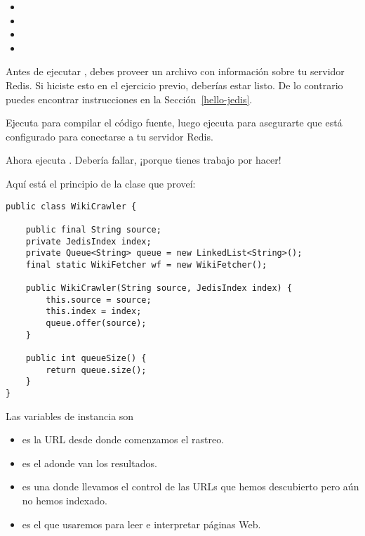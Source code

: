 \documentclass[12pt]{book}
\theoremstyle{exercise}
\begin{document}
\begin{itemize}
\item  {}
\item  {}
\item  {}
\item  {}
\end{itemize}

Antes de ejecutar , debes proveer un archivo con información
sobre tu servidor Redis. Si hiciste esto en el ejercicio previo, deberías
estar listo. De lo contrario puedes encontrar instrucciones en la
Sección~\ref{hello-jedis}.


Ejecuta  para compilar el código fuente, luego ejecuta
 para asegurarte que está configurado para conectarse
a tu servidor Redis.

Ahora ejecuta . Debería
fallar, ¡porque tienes trabajo por hacer!

Aquí está el principio de la clase  que proveí:

\begin{verbatim}
public class WikiCrawler {

    public final String source;
    private JedisIndex index;
    private Queue<String> queue = new LinkedList<String>();
    final static WikiFetcher wf = new WikiFetcher();

    public WikiCrawler(String source, JedisIndex index) {
        this.source = source;
        this.index = index;
        queue.offer(source);
    }

    public int queueSize() {
        return queue.size();
    }
}
\end{verbatim}

Las variables de instancia son

\begin{itemize}

\item
   es la URL desde donde comenzamos el rastreo.

\item
   es el  adonde van los resultados.

\item
   es una  donde llevamos el control de las URLs
  que hemos descubierto pero aún no hemos indexado.

\item
   es el  que usaremos para leer e interpretar
  páginas Web.

\end{itemize}
\end{document}
